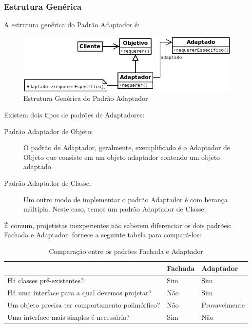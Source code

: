 \documentclass[
	11pt,				%
	openright,
	twoside,			%
	a4paper,			%
	english,			%
	french,
	brazil,				%
	sumario=tradicional
	]{abntex2}
\begin{document}
\subsubsection{Estrutura Genérica}
A estrutura genérica do Padrão Adaptador é:

\begin{figure}[h]
\begin{center}
\includegraphics[scale=0.6]{adaptador.png}
\caption{Estrutura Genérica do Padrão Adaptador}\label{fig:adaptador}
\end{center}
\end{figure}

Existem dois tipos de padrões de Adaptadores:
\begin{description}
\item[Padrão Adaptador de Objeto:] O padrão de Adaptador, geralmente, exemplificado é o Adaptador de Objeto que consiste em um objeto adaptador contendo um objeto adaptado.

\item[Padrão Adaptador de Classe:] Um outro modo de implementar o padrão Adaptador é com herança múltipla. Neste caso, temos um padrão Adaptador de Classe.
\end{description}

É comum, projetistas inexperientes não saberem diferenciar os dois padrões: Fachada e Adaptador.  fornece a seguinte tabela para compará-los:

\begin{table}[h]
\caption{Comparação entre os padrões Fachada e Adaptador}\label{tab:fachadaxadaptador}
\begin{center}
\begin{tabular}{lll}
 & \textbf{Fachada} & \textbf{Adaptador} \\
\hline
Há classes pré-existentes? & Sim & Sim \\
Há uma interface para a qual devemos projetar? & Não & Sim \\
Um objeto precisa ter comportamento polimórfico? & Não & Provavelmente \\
Uma interface mais simples é necessária? & Sim & Não\\
\hline %
\end{tabular}
\end{center}\end{table}
\end{document}
